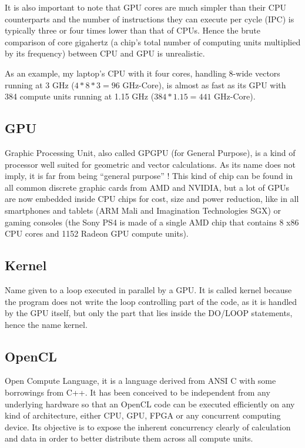 \documentclass[a4paper,12pt]{article}
\begin{document}
It is also important to note that GPU cores are much simpler than their CPU counterparts and the number of instructions they can execute per cycle (IPC) is typically three or four times lower than that of CPUs. Hence the brute comparison of core gigahertz (a chip's total number of computing units multiplied by its frequency) between CPU and GPU is unrealistic.

As an example, my laptop's CPU with it four cores, handling 8-wide vectors running at 3 GHz ($4*8*3=96$ GHz-Core), is almost as fast as its GPU with 384 compute units running at 1.15 GHz ($384*1.15=441$ GHz-Core).

\subsection{GPU}
Graphic Processing Unit, also called GPGPU (for General Purpose), is a kind of processor well suited for geometric and vector calculations. As its name does not imply, it is far from being ``general purpose'' ! This kind of chip can be found in all common discrete graphic cards from AMD and NVIDIA, but a lot of GPUs are now embedded inside CPU chips for cost, size and power reduction, like in all smartphones and tablets (ARM Mali and Imagination Technologies SGX) or gaming consoles (the Sony PS4 is made of a single AMD chip that contains 8 x86 CPU cores and 1152 Radeon GPU compute units).

\subsection{Kernel}
Name given to a loop executed in parallel by a GPU. It is called kernel because the program does not write the loop controlling part of the code, as it is handled by the GPU itself, but only the part that lies inside the DO/LOOP statements, hence the name kernel.

\subsection{OpenCL}
Open Compute Language, it is a language derived from ANSI C with some borrowings from C++. It has been conceived to be independent from any underlying hardware so that an OpenCL code can be executed efficiently on any kind of architecture, either CPU, GPU, FPGA or any concurrent computing device. Its objective is to expose the inherent concurrency clearly of calculation and data in order to better distribute them across all compute units.
\end{document}
